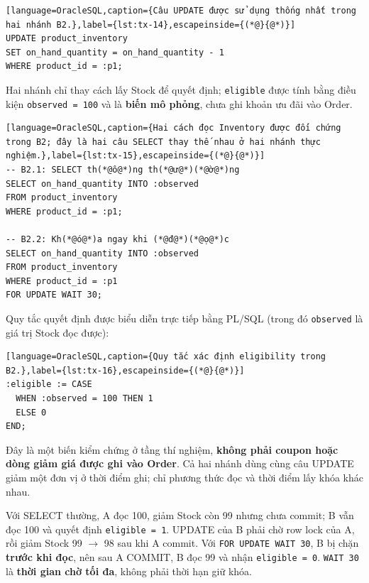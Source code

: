 \begin{lstlisting}[language=OracleSQL,caption={Câu UPDATE được sử dụng thống nhất trong hai nhánh B2.},label={lst:tx-14},escapeinside={(*@}{@*)}]
UPDATE product_inventory
SET on_hand_quantity = on_hand_quantity - 1
WHERE product_id = :p1;
\end{lstlisting}

Hai nhánh chỉ thay cách lấy Stock để quyết định; \texttt{eligible} được tính bằng điều kiện \texttt{observed =\allowbreak{} 100} và là \textbf{biến mô phỏng}, chưa ghi khoản ưu đãi vào Order.

\begin{lstlisting}[language=OracleSQL,caption={Hai cách đọc Inventory được đối chứng trong B2; đây là hai câu SELECT thay thế nhau ở hai nhánh thực nghiệm.},label={lst:tx-15},escapeinside={(*@}{@*)}]
-- B2.1: SELECT th(*@ô@*)ng th(*@ư@*)(*@ờ@*)ng
SELECT on_hand_quantity INTO :observed
FROM product_inventory
WHERE product_id = :p1;

-- B2.2: Kh(*@ó@*)a ngay khi (*@đ@*)(*@ọ@*)c
SELECT on_hand_quantity INTO :observed
FROM product_inventory
WHERE product_id = :p1
FOR UPDATE WAIT 30;
\end{lstlisting}

Quy tắc quyết định được biểu diễn trực tiếp bằng PL/SQL (trong đó \texttt{observed} là giá trị Stock đọc được):

\begin{lstlisting}[language=OracleSQL,caption={Quy tắc xác định eligibility trong B2.},label={lst:tx-16},escapeinside={(*@}{@*)}]
:eligible := CASE
  WHEN :observed = 100 THEN 1
  ELSE 0
END;
\end{lstlisting}

Đây là một biến kiểm chứng ở tầng thí nghiệm, \textbf{không phải coupon hoặc dòng giảm giá được ghi vào Order}. Cả hai nhánh dùng cùng câu UPDATE giảm một đơn vị ở thời điểm ghi; chỉ phương thức đọc và thời điểm lấy khóa khác nhau.

Với SELECT thường, A đọc 100, giảm Stock còn 99 nhưng chưa commit; B vẫn đọc 100 và quyết định \texttt{eligible =\allowbreak{} 1}. UPDATE của B phải chờ row lock của A, rồi giảm Stock 99 \(\rightarrow\) 98 sau khi A commit. Với \texttt{FOR UPDATE WAIT 30}, B bị chặn \textbf{trước khi đọc}, nên sau A COMMIT, B đọc 99 và nhận \texttt{eligible =\allowbreak{} 0}. \texttt{WAIT 30} là \textbf{thời gian chờ tối đa}, không phải thời hạn giữ khóa.

